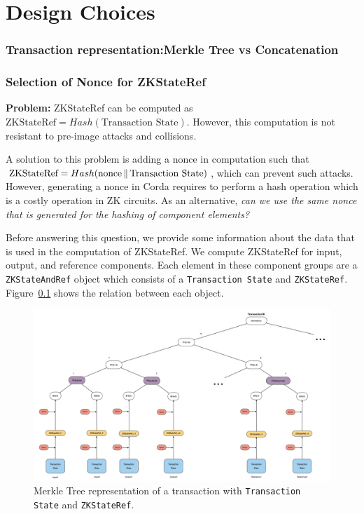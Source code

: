 \chapter*{Design Choices}

\subsection{Transaction representation:Merkle Tree vs Concatenation}

\subsection{Selection of Nonce for ZKStateRef}

\textbf{Problem:} ZKStateRef can be computed as $\text{ZKStateRef} = Hash(\text{Transaction State})$.
However, this computation is not resistant to pre-image attacks and collisions.

A solution to this problem is adding a nonce in computation such that $\text{ZKStateRef} = Hash(\text{nonce} \operatorname{\mathbin\Vert} \text{Transaction State})$, which can prevent such attacks.
However, generating a nonce in Corda requires to perform a hash operation which is a costly operation in ZK circuits.
As an alternative, \textit{can we use the same nonce that is generated for the hashing of component elements?}

Before answering this question, we provide some information about the data that is used in the computation of ZKStateRef.
We compute ZKStateRef for input, output, and reference components.
Each element in these component groups are a \texttt{ZKStateAndRef} object which consists of a \texttt{Transaction State} and \texttt{ZKStateRef}.
Figure~\ref{fig:tree_ts} shows the relation between each object.
 
\begin{figure}[ht]
\includegraphics[width=\textwidth]{Appendix1/images/tree_ts}
\caption{Merkle Tree representation of a transaction with \texttt{Transaction State} and \texttt{ZKStateRef}.}
\label{fig:tree_ts}
\end{figure}

